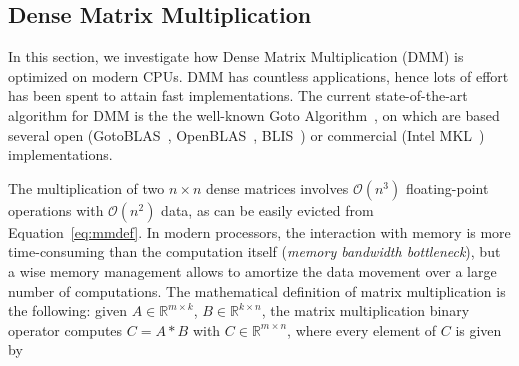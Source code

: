 
\subsection{Dense Matrix Multiplication}
\label{subsec:dmm}
In this section, we investigate how Dense Matrix Multiplication (DMM) is optimized on modern CPUs. DMM has countless applications, hence lots of effort has been spent to attain fast implementations. The current state-of-the-art algorithm for DMM is the the well-known Goto Algorithm~\cite{goto2008anatomy}, on which are based several open (GotoBLAS~\cite{goto2008anatomy}, OpenBLAS~\cite{xianyi2012openblas}, BLIS~\cite{huang2016blislab}) or commercial (Intel MKL~\cite{wang2014intel}) implementations.

The multiplication of two $ n \times n$ dense matrices involves $\mathcal{O}(n^3)$ floating-point operations with $\mathcal{O}(n^2)$ data, as can be easily evicted from Equation~\ref{eq:mmdef}. In modern processors, the interaction with memory is more time-consuming than the  computation itself (\textit{memory bandwidth bottleneck}), but a wise memory management allows to amortize the data movement over a large number of computations.
The mathematical definition of matrix multiplication is the following: given  $A \in \mathbb{R}^{m \times k}$, $B \in \mathbb{R}^{k \times n}$, the matrix multiplication binary operator computes $C = A*B$  with $C \in \mathbb{R}^{m \times n}$, where every element of $C$ is given by

